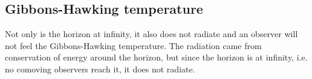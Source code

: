 \documentclass{article}
\begin{document}
\subsection{Gibbons-Hawking temperature}
Not only is the horizon at infinity, it also does not radiate and an observer will not feel the Gibbons-Hawking temperature. The radiation came from conservation of energy around the horizon, but since the horizon is at infinity, i.e. no comoving observers reach it, it does not radiate.
\end{document}
